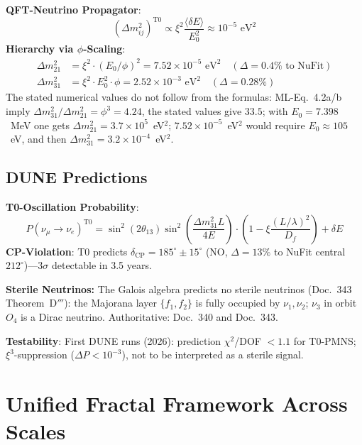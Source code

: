 	\textbf{QFT-Neutrino Propagator}:
	\begin{equation}
		(\Delta m_{ij}^2)^{\text{T0}} \propto \xi^2 \frac{\langle\delta E\rangle}{E_0^2} \approx 10^{-5} \text{ eV}^2 \tag{ML-Eq.~4.1}
	\end{equation}
	\textbf{Hierarchy via $\phi$-Scaling}:
	\begin{align}
		\Delta m_{21}^2 &= \xi^2 \cdot (E_0 / \phi)^2 = 7.52\times10^{-5} \text{ eV}^2 \quad (\Delta=0.4\% \text{ to NuFit}) \tag{ML-Eq.~4.2a} \\
		\Delta m_{31}^2 &= \xi^2 \cdot E_0^2 \cdot \phi = 2.52\times10^{-3} \text{ eV}^2 \quad (\Delta=0.28\%) \tag{ML-Eq.~4.2b}
	\end{align}
	The stated numerical values do not follow from the formulas: ML-Eq.~4.2a/b imply $\Delta m_{31}^2/\Delta m_{21}^2 = \phi^3 = 4.24$, the stated values give $33.5$; with $E_0 = 7.398$~MeV one gets $\Delta m_{21}^2 = 3.7\times10^{5}$~eV$^2$; $7.52\times10^{-5}$~eV$^2$ would require $E_0 \approx 105$~eV, and then $\Delta m_{31}^2 = 3.2\times10^{-4}$~eV$^2$.
	
	\subsection{DUNE Predictions}
	
	\textbf{T0-Oscillation Probability}:
	\begin{equation}
		P(\nu_\mu \to \nu_e)^{\text{T0}} = \sin^2(2\theta_{13}) \sin^2\left(\frac{\Delta m_{31}^2 L}{4E}\right) \cdot \left(1 - \xi \frac{(L/\lambda)^2}{D_f}\right) + \delta E \tag{ML-Eq.~4.3}
	\end{equation}
	\textbf{CP-Violation}: T0 predicts $\delta_{\text{CP}} = 185^\circ \pm 15^\circ$ (NO, $\Delta=13\%$ to NuFit central $212^\circ$)---3$\sigma$ detectable in 3.5 years.
	
	
	
\textbf{Sterile Neutrinos:} The Galois algebra predicts no sterile neutrinos (Doc.~343 Theorem~D$'''$): the Majorana
layer $\{f_1,f_2\}$ is fully occupied by $\nu_1,\nu_2$; $\nu_3$ in orbit $O_4$
is a Dirac neutrino. Authoritative: Doc.~340 and Doc.~343.

\textbf{Testability}: First DUNE runs (2026): prediction $\chi^2$/DOF $<1.1$ for T0-PMNS; $\xi^3$-suppression ($\Delta P<10^{-3}$), not to be interpreted as a sterile signal.
	
	\section{Unified Fractal Framework Across Scales}
	
